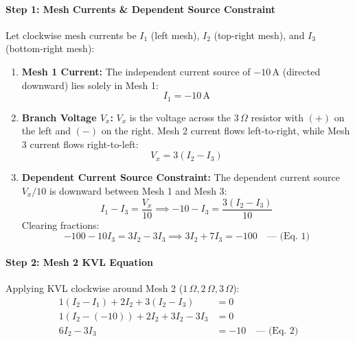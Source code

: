 \documentclass[11pt,a4paper,oneside]{article}
\begin{document}
\paragraph{Step 1: Mesh Currents \& Dependent Source Constraint}
Let clockwise mesh currents be $I_1$ (left mesh), $I_2$ (top-right mesh), and $I_3$ (bottom-right mesh):
\begin{enumerate}[leftmargin=1.5em]
  \item \textbf{Mesh 1 Current:} The independent current source of $-10\,\mathrm{A}$ (directed downward) lies solely in Mesh 1:
  \begin{equation}
    I_1 = -10\,\mathrm{A}
  \end{equation}
  \item \textbf{Branch Voltage $V_x$:} $V_x$ is the voltage across the $3\,\Omega$ resistor with $(+)$ on the left and $(-)$ on the right. Mesh 2 current flows left-to-right, while Mesh 3 current flows right-to-left:
  \begin{equation}
    V_x = 3(I_2 - I_3)
  \end{equation}
  \item \textbf{Dependent Current Source Constraint:} The dependent current source $V_x/10$ is downward between Mesh 1 and Mesh 3:
  \begin{equation}
    I_1 - I_3 = \frac{V_x}{10} \implies -10 - I_3 = \frac{3(I_2 - I_3)}{10}
  \end{equation}
  Clearing fractions:
  \begin{equation}
    -100 - 10 I_3 = 3 I_2 - 3 I_3 \implies 3 I_2 + 7 I_3 = -100 \quad \text{--- (Eq. 1)}
  \end{equation}
\end{enumerate}

\paragraph{Step 2: Mesh 2 KVL Equation}
Applying KVL clockwise around Mesh 2 ($1\,\Omega, 2\,\Omega, 3\,\Omega$):
\begin{align}
  1(I_2 - I_1) + 2 I_2 + 3(I_2 - I_3) &= 0 \nonumber \\
  1(I_2 - (-10)) + 2 I_2 + 3 I_2 - 3 I_3 &= 0 \nonumber \\
  6 I_2 - 3 I_3 &= -10 \quad \text{--- (Eq. 2)}
\end{align}
\end{document}
